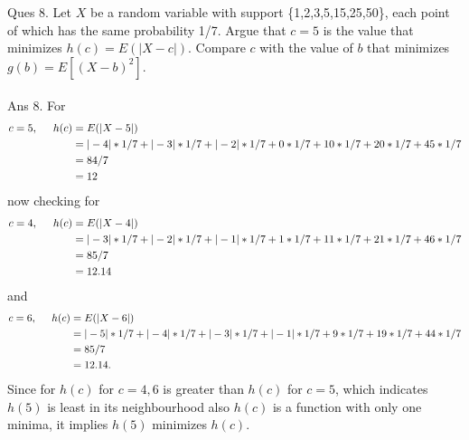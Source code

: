 \documentclass{article}
\begin{document}
Ques 8. Let $X$ be a random variable with support \{1,2,3,5,15,25,50\}, each point of which has the same probability 1/7. Argue that $c=5$ is the value that minimizes $h(c) = E(|X-c|)$. Compare $c$ with the value of $b$ that minimizes $g(b) = E[(X-b)^2]$.\\
\\
Ans 8. For 
\begin{align*}
c=5,\hspace{5mm} h(c) &= E(|X-5|)\\
          &=|-4|*1/7+|-3|*1/7+|-2|*1/7+0*1/7+10*1/7+20*1/7+45*1/7\\
          &=84/7\\
          &=12
\end{align*} 
now checking for
\begin{align*}
c=4,\hspace{5mm} h(c) &= E(|X-4|)\\
          &=|-3|*1/7+|-2|*1/7+|-1|*1/7+1*1/7+11*1/7+21*1/7+46*1/7\\
          &=85/7\\
          &=12.14
\end{align*} 
and
\begin{align*}
c=6,\hspace{5mm} h(c) &= E(|X-6|)\\
          &=|-5|*1/7+|-4|*1/7+|-3|*1/7+|-1|*1/7+9*1/7+19*1/7+44*1/7\\
          &=85/7\\
          &=12.14.
\end{align*} 
Since for $h(c)$ for $c=4,6$ is greater than $h(c)$ for $c=5$, which indicates $h(5)$ is least in its neighbourhood also $h(c)$ is a function with only one minima, it implies $h(5)$ minimizes $h(c)$.\\
\end{document}
